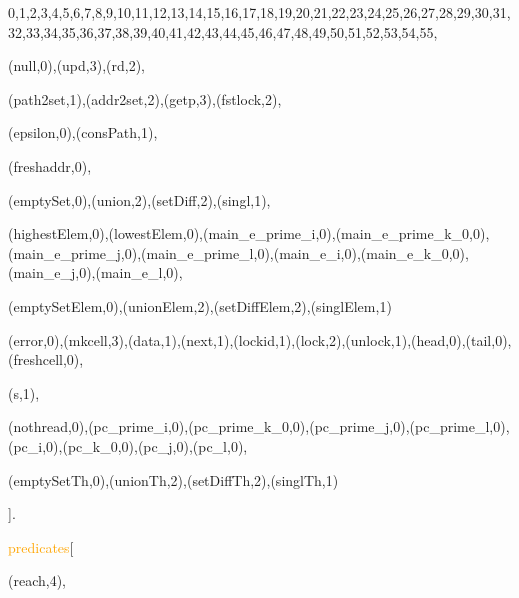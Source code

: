 
    0,1,2,3,4,5,6,7,8,9,10,11,12,13,14,15,16,17,18,19,20,21,22,23,24,25,26,27,28,29,30,31,32,33,34,35,36,37,38,39,40,41,42,43,44,45,46,47,48,49,50,51,52,53,54,55,


    


(null,0),(upd,3),(rd,2),




(path2set,1),(addr2set,2),(getp,3),(fstlock,2),


(epsilon,0),(consPath,1),


(freshaddr,0),


(emptySet,0),(union,2),(setDiff,2),(singl,1),


(highestElem,0),(lowestElem,0),(main\_e\_prime\_i,0),(main\_e\_prime\_k\_0,0),(main\_e\_prime\_j,0),(main\_e\_prime\_l,0),(main\_e\_i,0),(main\_e\_k\_0,0),(main\_e\_j,0),(main\_e\_l,0),


(emptySetElem,0),(unionElem,2),(setDiffElem,2),(singlElem,1)


(error,0),(mkcell,3),(data,1),(next,1),(lockid,1),(lock,2),(unlock,1),(head,0),(tail,0),(freshcell,0),


(s,1),


(nothread,0),(pc\_prime\_i,0),(pc\_prime\_k\_0,0),(pc\_prime\_j,0),(pc\_prime\_l,0),(pc\_i,0),(pc\_k\_0,0),(pc\_j,0),(pc\_l,0),


(emptySetTh,0),(unionTh,2),(setDiffTh,2),(singlTh,1)

].


\textcolor{orange}{predicates}[


    


    


    (reach,4),

